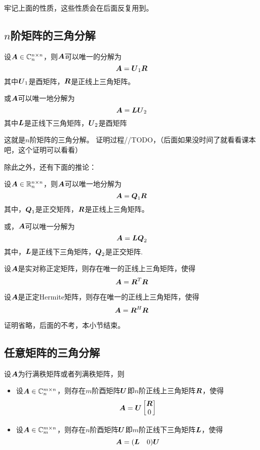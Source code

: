 \documentclass[12pt, a4paper, oneside, UTF8]{ctexbook}
\begin{document}
    牢记上面的性质，这些性质会在后面反复用到。


    \subsection{$n$阶矩阵的三角分解}
    \begin{them}{}{}
        设$\boldsymbol{A}\in\mathbb{C}^{n\times n}_n$，则$\boldsymbol{A}$可以唯一的分解为\[\boldsymbol{A}=\boldsymbol{U}_1\boldsymbol{R}\]其中$\boldsymbol{U}_1$是酉矩阵，$\boldsymbol{R}$是正线上三角矩阵。

        或$\boldsymbol{A}$可以唯一地分解为\[\boldsymbol{A}=\boldsymbol{L}\boldsymbol{U}_2\]其中$\boldsymbol{L}$是正线下三角矩阵，$\boldsymbol{U}_2$是酉矩阵
    \end{them}

    这就是$n$阶矩阵的三角分解。
    证明过程//TODO，（后面如果没时间了就看看课本吧，这个证明可以看看）

    除此之外，还有下面的推论：
    \begin{corollary}{}{}
        设$\boldsymbol{A}\in\mathbb{R}_{n}^{n\times n}$，则$\boldsymbol{A}$可以唯一地分解为\[\boldsymbol{A}=\boldsymbol{Q}_1\boldsymbol{R}\]其中，$\boldsymbol{Q}_1$是正交矩阵，$\boldsymbol{R}$是正线上三角矩阵。

        或，$\boldsymbol{A}$可以唯一分解为\[\boldsymbol{A}=\boldsymbol{L}\boldsymbol{Q}_2\]其中，$\boldsymbol{L}$是正线下三角矩阵，$\boldsymbol{Q}_2$是正交矩阵.
    \end{corollary}

\begin{corollary}{}{}
    设$\boldsymbol{A}$是实对称正定矩阵，则存在唯一的正线上三角矩阵，使得\[\boldsymbol{A}=\boldsymbol{R}^T\boldsymbol{R}\]
\end{corollary}

\begin{corollary}{}{}
    设$\boldsymbol{A}$是正定Hermite矩阵，则存在唯一的正线上三角矩阵，使得\[\boldsymbol{A}=\boldsymbol{R}^H\boldsymbol{R}\]
\end{corollary}
证明省略，后面的不考，本小节结束。
\subsection{任意矩阵的三角分解}
\begin{them}{}{}
    设$\boldsymbol{A}$为行满秩矩阵或者列满秩矩阵，则
    \begin{itemize}
        \item 设$\boldsymbol{A}\in\mathbb{C}^{m\times n}_n$，则存在$m$阶酉矩阵$\boldsymbol{U}$即$n$阶正线上三角矩阵$\boldsymbol{R}$，使得\[\boldsymbol{A}=\boldsymbol{U}\begin{bmatrix}
            \boldsymbol{R}\\0
        \end{bmatrix}\]
        \item 设$\boldsymbol{A}\in\mathbb{C}^{m\times n}_m$，则存在$n$阶酉矩阵$\boldsymbol{U}$即$m$阶正线下三角矩阵$\boldsymbol{L}$，使得\[\boldsymbol{A}=(\boldsymbol{L}\ \ \ 0)\boldsymbol{U}\]
    \end{itemize}
\end{them}
\end{document}
